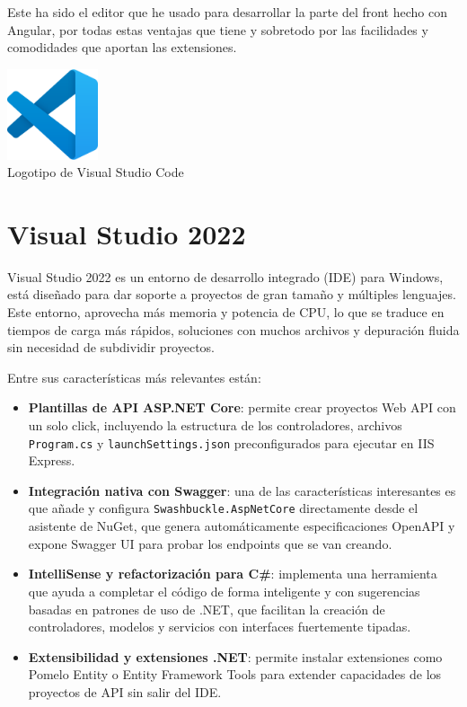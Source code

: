 Este ha sido el editor que he usado para desarrollar la parte del front hecho con Angular, por todas estas ventajas que tiene y sobretodo por las facilidades y comodidades que aportan las extensiones.

\begin{center}
  \includegraphics[width=0.2\textwidth]{img/vscode-logo.png}\\
  \small Logotipo de Visual Studio Code
\end{center}


\section{Visual Studio 2022}\label{visual-studio}

Visual Studio 2022 es un entorno de desarrollo integrado (IDE) para Windows, está diseñado para dar soporte a proyectos de gran tamaño y múltiples lenguajes. Este entorno, aprovecha más memoria y potencia de CPU, lo que se traduce en tiempos de carga más rápidos, soluciones con muchos archivos y depuración fluida sin necesidad de subdividir proyectos.

Entre sus características más relevantes están:
\begin{itemize}
  \item \textbf{Plantillas de API ASP.NET Core}: permite crear proyectos Web API con un solo click, incluyendo la estructura de los controladores, archivos \texttt{Program.cs} y \texttt{launchSettings.json} preconfigurados para ejecutar en IIS Express.
  \item \textbf{Integración nativa con Swagger}: una de las características interesantes es que añade y configura \texttt{Swashbuckle.AspNetCore} directamente desde el asistente de NuGet, que genera automáticamente especificaciones OpenAPI y expone Swagger UI para probar los endpoints que se van creando.
  \item \textbf{IntelliSense y refactorización para C\#}: implementa una herramienta que ayuda a completar el código de forma inteligente y con sugerencias basadas en patrones de uso de .NET, que facilitan la creación de controladores, modelos y servicios con interfaces fuertemente tipadas.
  \item \textbf{Extensibilidad y extensiones .NET}: permite instalar extensiones como Pomelo Entity o Entity Framework Tools para extender capacidades de los proyectos de API sin salir del IDE.
\end{itemize}

